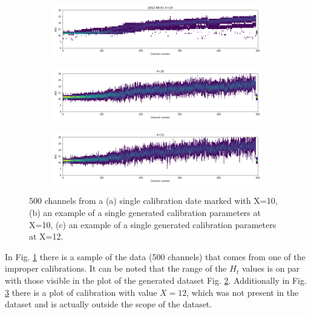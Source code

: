\begin{figure}
    \centering
\begin{subfigure}[b]{\textwidth}
    \centering
    \includegraphics[width=0.9\linewidth]{figures/chapter4/outlierness/real_data.png}
    \caption{}
    \label{plot:real-data}
  \end{subfigure}

\begin{subfigure}[b]{\textwidth}
    \centering
    \includegraphics[width=0.9\linewidth]{figures/chapter4/outlierness/generated_data.png}
    \caption{}
    \label{plot:generated-data}
  \end{subfigure}


\begin{subfigure}[b]{\textwidth}
    \centering
    \includegraphics[width=0.9\linewidth]{figures/chapter4/outlierness/generated_x12.png}
    \caption{}
    \label{plot:generated-12}
  \end{subfigure}
    \caption{500 channels from a (a) single calibration date marked with X=10, (b) an example of a single generated calibration parameters at X=10, (c) an example of a single generated calibration parameters at X=12.}
    \label{plot:outlierness_data_example}
\end{figure}

In Fig. \ref{plot:real-data} there is a sample of the data (500 channels) that comes from one of the improper calibrations.
It can be noted that the range of the $H_{t}$ values is on par with those visible in the plot of the generated dataset Fig. \ref{plot:generated-data}.
 Additionally in Fig. \ref{plot:generated-12} there is a plot of calibration with value $X=12$, which was not present in the dataset and is actually outside the scope of the dataset.

